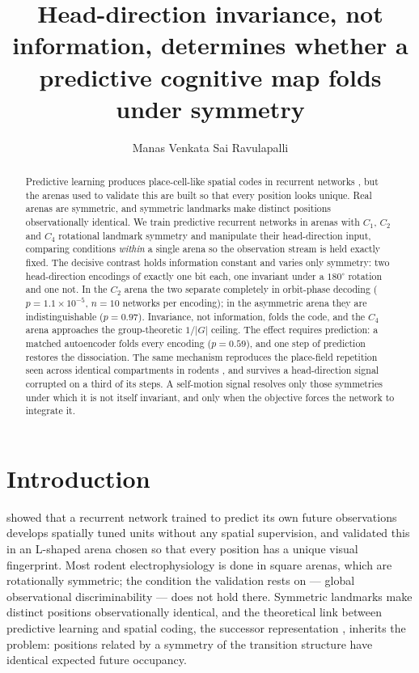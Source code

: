 \documentclass[9pt,lineno]{elife}
\title{Head-direction invariance, not information, determines whether a predictive cognitive
map folds under symmetry}
\author[1]{Manas Venkata Sai Ravulapalli}
\affil[1]{Ashoka University, Sonipat, India}
\begin{document}
\maketitle

\begin{abstract}
\noindent
Predictive learning produces place-cell-like spatial codes in recurrent networks
\citep{levenstein2024}, but the arenas used to validate this are built so that every position
looks unique. Real arenas are symmetric, and symmetric landmarks make distinct positions
observationally identical. We train predictive recurrent networks in arenas with $C_1$, $C_2$
and $C_4$ rotational landmark symmetry and manipulate their head-direction input, comparing
conditions \emph{within} a single arena so the observation stream is held exactly fixed. The
decisive contrast holds information constant and varies only symmetry: two head-direction
encodings of exactly one bit each, one invariant under a $180^\circ$ rotation and one not. In
the $C_2$ arena the two separate completely in orbit-phase decoding ($p = 1.1\times10^{-5}$,
$n = 10$ networks per encoding); in the asymmetric arena they are indistinguishable
($p = 0.97$). Invariance, not information, folds the code, and the $C_4$ arena approaches the group-theoretic
$1/|G|$ ceiling. The effect requires prediction: a matched autoencoder folds every encoding
($p = 0.59$), and one step of prediction restores the dissociation. The same mechanism reproduces the
place-field repetition seen across identical compartments in rodents \citep{grieves2016}, and
survives a head-direction signal corrupted on a third of its steps. A self-motion signal
resolves only those symmetries under which it is not itself invariant, and only when the
objective forces the network to integrate it.
\end{abstract}

\section{Introduction}

\citet{levenstein2024} showed that a recurrent network trained to predict its own future
observations develops spatially tuned units without any spatial supervision, and validated
this in an L-shaped arena chosen so that every position has a unique visual fingerprint. Most
rodent electrophysiology is done in square arenas, which are rotationally symmetric; the
condition the validation rests on --- global observational discriminability --- does not hold
there. Symmetric landmarks make distinct positions observationally identical, and the
theoretical link between predictive learning and spatial coding, the successor representation
\citep{stachenfeld2017}, inherits the problem: positions related by a symmetry of the
transition structure have identical expected future occupancy.
\end{document}
